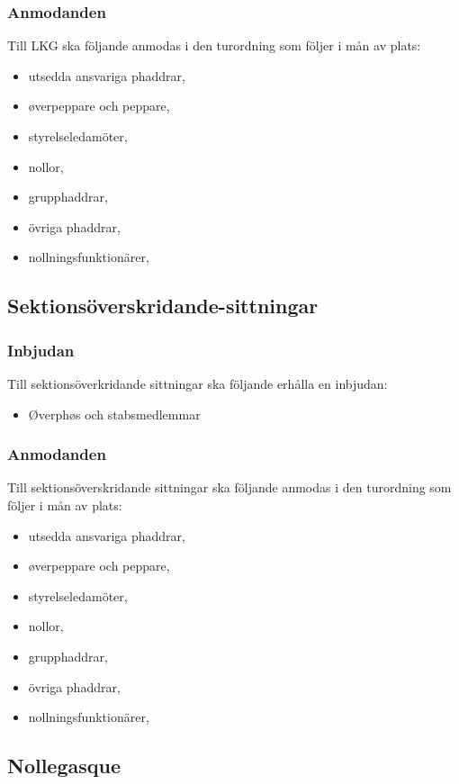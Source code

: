 \documentclass{dsekprotokoll}
\begin{document}
\subsubsection{Anmodanden}
Till LKG ska följande anmodas i den turordning som följer i mån av plats:
\begin{itemize}
    \item utsedda ansvariga phaddrar,
    \item øverpeppare och peppare,
    \item styrelseledamöter,
    \item nollor,
    \item grupphaddrar,
    \item övriga phaddrar,
    \item nollningsfunktionärer,
\end{itemize}


\subsection{Sektionsöverskridande-sittningar}

\subsubsection{Inbjudan}
Till sektionsöverkridande sittningar ska följande erhålla en inbjudan:
\begin{itemize}
    \item Øverphøs och stabsmedlemmar
\end{itemize}

\subsubsection{Anmodanden}
Till sektionsöverskridande sittningar ska följande anmodas i den turordning som följer i mån
av plats:
  \begin{itemize}
    \item utsedda ansvariga phaddrar,
    \item øverpeppare och peppare,
    \item styrelseledamöter,
    \item nollor,
    \item grupphaddrar,
    \item övriga phaddrar,
    \item nollningsfunktionärer,
  \end{itemize}

\subsection{Nollegasque}
\end{document}
